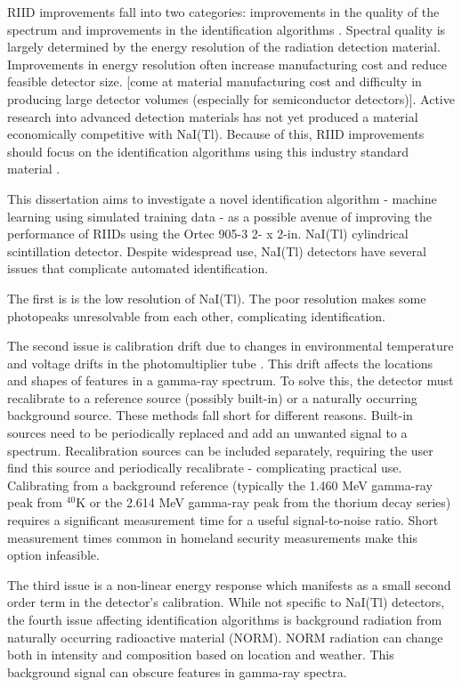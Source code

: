 
RIID improvements fall into two categories: improvements in the quality of the spectrum and improvements in the identification algorithms \cite{swoboda2004}. Spectral quality is largely determined by the energy resolution of the radiation detection material. Improvements in energy resolution often increase manufacturing cost and reduce feasible detector size. [come at material manufacturing cost and difficulty in producing large detector volumes (especially for semiconductor detectors)]. Active research into advanced detection materials has not yet produced a material economically competitive with NaI(Tl). Because of this, RIID improvements should focus on the identification algorithms using this industry standard material \cite{blackadar2003}.

This dissertation aims to investigate a novel identification algorithm - machine learning using simulated training data - as a possible avenue of improving the performance of RIIDs using the Ortec 905-3 2- x 2-in. NaI(Tl) cylindrical scintillation detector. Despite widespread use, NaI(Tl) detectors have several issues that complicate automated identification.

The first is is the low resolution of NaI(Tl). The poor resolution makes some photopeaks unresolvable from each other, complicating identification.

The second issue is calibration drift due to changes in environmental temperature and voltage drifts in the photomultiplier tube \cite{knoll,gilmore}. This drift affects the locations and shapes of features in a gamma-ray spectrum. To solve this, the detector must recalibrate to a reference source (possibly built-in) or a naturally occurring background source. These methods fall short for different reasons. Built-in sources need to be periodically replaced and add an unwanted signal to a spectrum. Recalibration sources can be included separately, requiring the user find this source and periodically recalibrate - complicating practical use. Calibrating from a background reference (typically the 1.460 MeV gamma-ray peak from $^{40}$K or the 2.614 MeV gamma-ray peak from the thorium decay series) requires a significant measurement time for a useful signal-to-noise ratio. Short measurement times common in homeland security measurements make this option infeasible.

The third issue is a non-linear energy response which manifests as a small second order term in the detector's calibration. While not specific to NaI(Tl) detectors, the fourth issue affecting identification algorithms is background radiation from naturally occurring radioactive material (NORM). NORM radiation can change both in intensity and composition based on location and weather. This background signal can obscure features in gamma-ray spectra.

